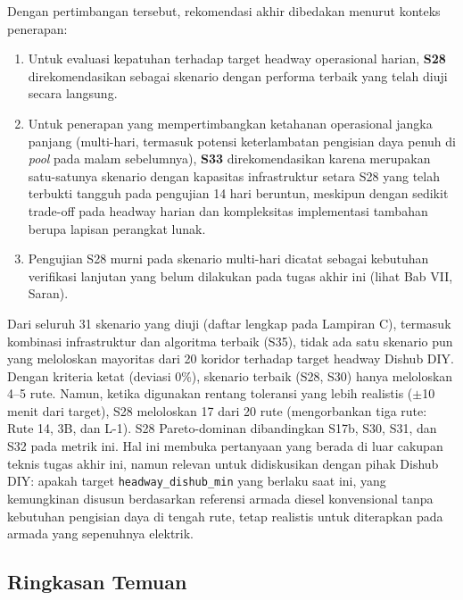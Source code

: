 Dengan pertimbangan tersebut, rekomendasi akhir dibedakan menurut
konteks penerapan:
\begin{enumerate}
	\item Untuk evaluasi kepatuhan terhadap target headway operasional
	harian, \textbf{S28} direkomendasikan sebagai skenario dengan performa
	terbaik yang telah diuji secara langsung.
	\item Untuk penerapan yang mempertimbangkan ketahanan operasional
	jangka panjang (multi-hari, termasuk potensi keterlambatan pengisian
	daya penuh di \textit{pool} pada malam sebelumnya), \textbf{S33}
	direkomendasikan karena merupakan satu-satunya skenario dengan
	kapasitas infrastruktur setara S28 yang telah terbukti tangguh pada
	pengujian 14 hari beruntun, meskipun dengan sedikit trade-off pada
	headway harian dan kompleksitas implementasi tambahan berupa lapisan
	perangkat lunak.
	\item Pengujian S28 murni pada skenario multi-hari dicatat sebagai
	kebutuhan verifikasi lanjutan yang belum dilakukan pada tugas akhir
	ini (lihat Bab VII, Saran).
\end{enumerate}



Dari seluruh 31 skenario yang diuji (daftar lengkap pada Lampiran C),
termasuk kombinasi infrastruktur dan algoritma terbaik (S35), tidak ada
satu skenario pun yang meloloskan mayoritas dari 20 koridor terhadap target headway
Dishub DIY. Dengan kriteria ketat (deviasi 0\%), skenario terbaik (S28, S30)
hanya meloloskan 4--5 rute. Namun, ketika digunakan rentang toleransi yang
lebih realistis ($\pm$10 menit dari target), S28 meloloskan 17 dari 20 rute
(mengorbankan tiga rute: Rute 14, 3B, dan L-1).
S28 Pareto-dominan dibandingkan S17b, S30, S31, dan S32 pada metrik ini. Hal ini membuka pertanyaan yang berada di luar cakupan teknis
tugas akhir ini, namun relevan untuk didiskusikan dengan pihak Dishub
DIY: apakah target \texttt{headway\_dishub\_min} yang berlaku saat ini,
yang kemungkinan disusun berdasarkan referensi armada diesel konvensional
tanpa kebutuhan pengisian daya di tengah rute, tetap realistis untuk
diterapkan pada armada yang sepenuhnya elektrik.

\subsection{Ringkasan Temuan}

